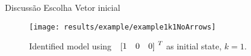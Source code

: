 \begin{frame}{Discussão Escolha Vetor inicial}
\begin{figure}[H]
  \centering
  \texttt{[image: results/example/example1k1NoArrows]}
  \caption{Identified model using $\colvec{1&0&0}^T$ as initial state, $k=1$.}
    \label{fig:exampleCol100k1}
\end{figure}
\end{frame}





